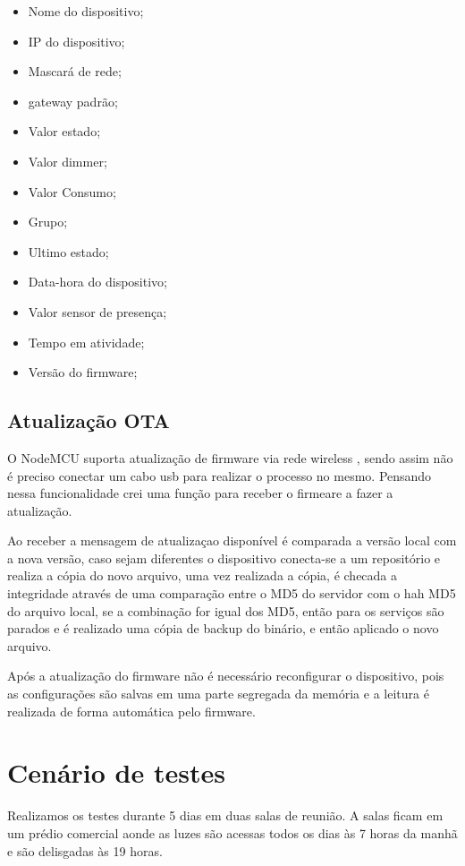 \documentclass[openright]{normas-utf-tex} %
\begin{document}
\begin{itemize}
    \item Nome do dispositivo;
    \item IP do dispositivo;
    \item Mascará de rede;
    \item gateway padrão;
    \item Valor estado;
    \item Valor dimmer;
    \item Valor Consumo;
    \item Grupo;
    \item Ultimo estado;
    \item Data-hora do dispositivo;
    \item Valor sensor de presença;
    \item Tempo em atividade;
    \item Versão do firmware;
\end{itemize}

\subsection{Atualização OTA}

O NodeMCU suporta atualização de firmware via rede wireless  \cite{espressif}, sendo assim não é preciso conectar um cabo usb para realizar o processo no mesmo. 
Pensando nessa funcionalidade crei uma função para receber o firmeare a fazer a atualização.

Ao receber a mensagem de atualizaçao disponível é comparada a versão local com a nova versão, caso sejam diferentes o dispositivo conecta-se a um repositório e realiza a cópia do novo arquivo, uma vez realizada a cópia, é checada a integridade através de uma comparação entre o  MD5 do servidor com o hah MD5 do arquivo local, se a combinação for igual dos MD5, então para os serviços são parados e é realizado uma cópia de backup do binário, e então aplicado o novo arquivo.

Após a atualização do firmware não é necessário reconfigurar o dispositivo, pois as configurações são salvas em uma parte segregada da memória e a leitura é realizada de forma automática pelo firmware.

\section{Cenário de testes}
Realizamos os testes durante 5 dias em duas salas de reunião. A salas ficam em um prédio comercial aonde as luzes são acessas todos os dias às 7 horas da manhã e são delisgadas às 19 horas.
\end{document}
